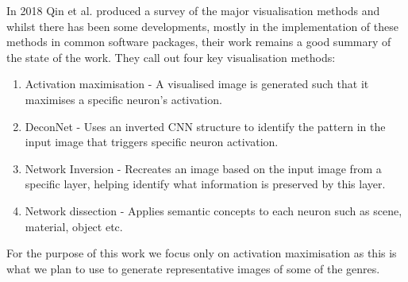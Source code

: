 \documentclass[12pt]{article}
\numberwithin{equation}{section}
\numberwithin{figure}{section}
\begin{document}
In 2018 Qin et al. \cite{Qin2018a} produced a survey of the major visualisation methods and whilst there has been some developments, mostly in the implementation of these methods in common software packages, their work remains a good summary of the state of the work. They call out four key visualisation methods:
\begin{enumerate}
	\item Activation maximisation - A visualised image is generated such that it maximises a specific neuron's activation.
	\item DeconNet - Uses an inverted CNN structure to identify the pattern in the input image that triggers specific neuron activation.
	\item Network Inversion - Recreates an image based on the input image from a specific layer, helping identify what information is preserved by this layer.
	\item Network dissection  - Applies semantic concepts to each neuron such as scene, material, object etc.
\end{enumerate}
For the purpose of this work we focus only on activation maximisation as this is what we plan to use to generate representative images of some of the genres. 
\end{document}
